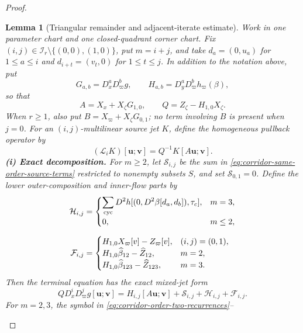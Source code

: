 \documentclass[11pt]{amsart}
\numberwithin{equation}{section}
\newtheorem{lemma}[theorem]{Lemma}
\theoremstyle{definition}
\theoremstyle{remark}
\begin{document}
\begin{proof}
\begin{lemma}[Triangular remainder and adjacent-iterate estimate]
\label{lem:corridor-triangular-remainder}
Work in one parameter chart and one closed-quadrant corner chart.  Fix
$(i,j)\in\mathcal I_r\setminus\{(0,0),(1,0)\}$, put $m=i+j$, and take
$d_a=(0,u_a)$ for $1\le a\le i$ and
$d_{i+t}=(v_t,0)$ for $1\le t\le j$.  In addition to the notation above,
put
\[
 G_{a,b}=D_x^aD_\varpi^b g,
 \qquad H_{a,b}=D_y^aD_\varpi^b h_\varpi(\beta),
\]
so that
\[
 A=X_x+X_\zeta G_{1,0},\qquad
 Q=Z_\zeta-H_{1,0}X_\zeta.
\]
When $r\ge1$, also put
$B=X_\varpi+X_\zeta G_{0,1}$; no term involving $B$ is present when
$j=0$.
For an $(i,j)$-multilinear source jet $K$, define the homogeneous
pullback operator by
\begin{equation}\label{eq:corridor-local-homogeneous-jet-operator}
 (\mathcal L_iK)[\mathbf u;\mathbf v]
 =Q^{-1}K[A\mathbf u;\mathbf v].
\end{equation}
\smallskip
\noindent\textup{\textbf{(i) Exact decomposition.}}
For $m\ge2$, let $\mathcal S_{i,j}$ be the sum in
\eqref{eq:corridor-same-order-source-terms} restricted to nonempty
subsets $S$, and set $\mathcal S_{0,1}=0$.  Define the lower
outer-composition and inner-flow parts by
\begin{equation}\label{eq:corridor-three-remainder-classes}
 \begin{aligned}
 \mathcal H_{i,j}
 &=\begin{cases}
   \displaystyle\sum_{\rm cyc}
   D^2h[(0,D^2\beta[d_a,d_b]),\tau_c],&m=3,\\
   0,&m\le2,
  \end{cases}\\[2mm]
 \mathcal F_{i,j}
 &=\begin{cases}
   H_{1,0}X_\varpi[v]-Z_\varpi[v],&(i,j)=(0,1),\\
   H_{1,0}\widehat\beta_{12}-\widehat Z_{12},&m=2,\\
   H_{1,0}\widehat\beta_{123}-\widehat Z_{123},&m=3.
  \end{cases}
 \end{aligned}
\end{equation}
Then the terminal equation has the exact mixed-jet form
\begin{equation}\label{eq:corridor-exact-triangular-remainder}
 QD_x^iD_\varpi^jg[\mathbf u;\mathbf v]
 =H_{i,j}[A\mathbf u;\mathbf v]
  +\mathcal S_{i,j}+\mathcal H_{i,j}+\mathcal F_{i,j}.
\end{equation}
For $m=2,3$, the symbol in
\eqref{eq:corridor-order-two-recurrences}--

\end{lemma}
\end{proof}
\end{document}
